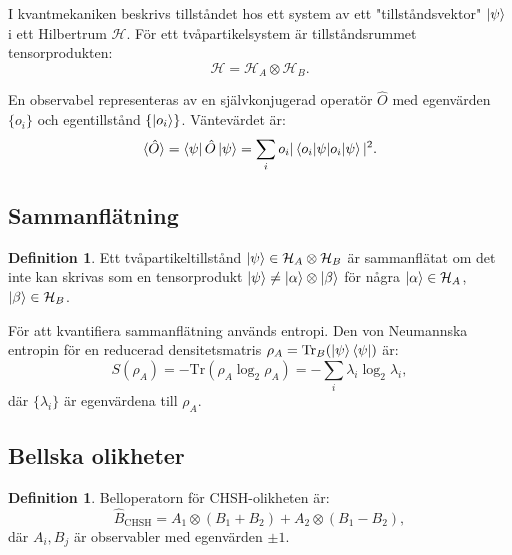 \documentclass[12pt,a4paper]{article}
\theoremstyle{plain}
\theoremstyle{definition}
\newtheorem{definition}[theorem]{Definition}
\theoremstyle{remark}
\begin{document}
I kvantmekaniken beskrivs tillst\r{a}ndet hos ett system av
ett "tillst\r{a}ndsvektor" $\ket{\psi}$ i ett Hilbertrum
$\mathcal{H}$. F\"or ett tv\r{a}partikelsystem \"ar
tillst\r{a}ndsrummet tensorprodukten:
\begin{equation}
\label{eq:tensor}
\mathcal{H} = \mathcal{H}_A \otimes \mathcal{H}_B.
\end{equation}

En observabel representeras av en sj\"alvkonjugerad operat\"or
$\hat{O}$ med egenv\"arden $\{o_i\}$ och egentillst\r{a}nd $\{\ket{o_i}\}$.
V\"antev\"ardet \"ar:
\begin{equation}
\label{eq:expectation}
\langle \hat{O} \rangle = \bra{\psi} \hat{O} \ket{\psi} = \sum_i o_i |\braket{o_i | \psi}|^2.
\end{equation}

\subsection{Sammanfl\"atning}

\begin{definition}
\label{def:entanglement}
Ett tv\r{a}partikeltillst\r{a}nd $\ket{\psi} \in \mathcal{H}_A \otimes \mathcal{H}_B$
\"ar sammanfl\"atat om det inte kan skrivas som en tensorprodukt
$\ket{\psi} \neq \ket{\alpha} \otimes \ket{\beta}$ f\"or n\r{a}gra
$\ket{\alpha} \in \mathcal{H}_A$, $\ket{\beta} \in \mathcal{H}_B$.
\end{definition}

F\"or att kvantifiera sammanfl\"atning anv\"ands entropi. Den
von Neumannska entropin f\"or en reducerad densitetsmatris
$\rho_A = \mathrm{Tr}_B(\ket{\psi}\bra{\psi})$ \"ar:
\begin{equation}
\label{eq:von_neumann}
S(\rho_A) = -\mathrm{Tr}(\rho_A \log_2 \rho_A) = -\sum_i \lambda_i \log_2 \lambda_i,
\end{equation}
d\"ar $\{\lambda_i\}$ \"ar egenv\"ardena till $\rho_A$.

\subsection{Bellska olikheter}

\begin{definition}
\label{def:bell_operator}
Belloperatorn f\"or CHSH-olikheten \"ar:
\[
\hat{B}_{\mathrm{CHSH}} = A_1 \otimes (B_1 + B_2) + A_2 \otimes (B_1 - B_2),
\]
d\"ar $A_i, B_j$ \"ar observabler med egenv\"arden $\pm 1$.
\end{definition}
\end{document}
